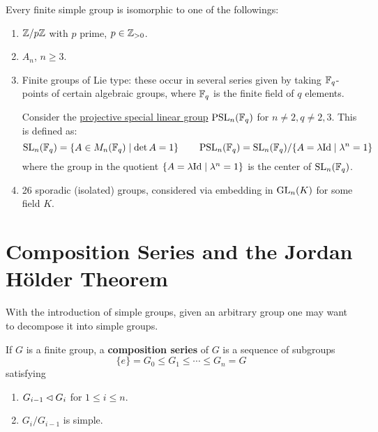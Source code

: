 \begin{theorem}
    Every finite simple group is isomorphic to one of the followings:
    \begin{enumerate}
        \item $\mathbb{Z}/p\mathbb{Z}$ with $p$ prime, $p \in \mathbb{Z}_{> 0}$.
        \item $A_n$, $n \geq 3$.
        \item Finite groups of Lie type: these occur in several series given by taking $\mathbb{F}_q$-points of certain algebraic groups, where $\mathbb{F}_q$ is the finite field of $q$ elements.
        \begin{example}
            Consider the \underline{projective special linear group} $\operatorname{PSL}_n(\mathbb{F}_q)$ for $n \neq 2, q \neq 2, 3$. This is defined as:
            \[
                \operatorname{SL}_n(\mathbb{F}_q) = \{A \in M_n(\mathbb{F}_q) \mid \det A = 1\} \qquad \operatorname{PSL}_n(\mathbb{F}_q) = \operatorname{SL}_n(\mathbb{F}_q)/\{A = \lambda \mathrm{Id} \mid \lambda^n = 1\}
            \]
            where the group in the quotient $\{A = \lambda \mathrm{Id} \mid \lambda^n = 1\}$ is the center of $\operatorname{SL}_n(\mathbb{F}_q)$.
        \end{example}
        \item 26 sporadic (isolated) groups, considered via embedding in $\mathrm{GL}_n(K)$ for some field $K$. 
    \end{enumerate}
\end{theorem}

\section{Composition Series and the Jordan H\"older Theorem}

\textstart
With the introduction of simple groups, given an arbitrary group one may want to decompose it into simple groups.

\begin{definition}
    If $G$ is a finite group, a \textbf{composition series} of $G$ is a sequence of subgroups
    \[
        \{e\} = G_0 \leq G_1 \leq \cdots \leq G_n = G
    \]
    satisfying
    \begin{enumerate}[label=\arabic*)]
        \item $G_{i-1} \lhd G_i$ for $1 \leq i \leq n$.
        \item $G_i/G_{i-1}$ is simple.
    \end{enumerate}
\end{definition}

